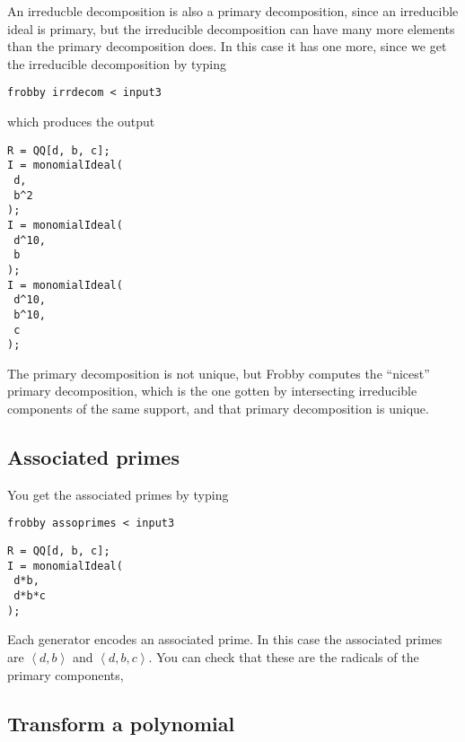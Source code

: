 \documentclass{amsart}
\theoremstyle{definition}
\newcommand{\ideal}[1]{\left<#1\right>}
\begin{document}
An irreducble decomposition is also a primary decomposition, since an
irreducible ideal is primary, but the irreducible decomposition can
have many more elements than the primary decomposition does. In this
case it has one more, since we get the irreducible decomposition by typing
\begin{verbatim}
frobby irrdecom < input3
\end{verbatim}
which produces the output
\begin{verbatim}
R = QQ[d, b, c];
I = monomialIdeal(
 d,
 b^2
);
I = monomialIdeal(
 d^10,
 b
);
I = monomialIdeal(
 d^10,
 b^10,
 c
);
\end{verbatim}

The primary decomposition is not unique, but Frobby computes the
``nicest'' primary decomposition, which is the one gotten by
intersecting irreducible components of the same support, and that
primary decomposition is unique.

\subsection{Associated primes}

You get the associated primes by typing
\begin{verbatim}
frobby assoprimes < input3
\end{verbatim}

\begin{verbatim}
R = QQ[d, b, c];
I = monomialIdeal(
 d*b,
 d*b*c
);
\end{verbatim}
Each generator encodes an associated prime. In this case the
associated primes are $\ideal{d,b}$ and $\ideal{d,b,c}$. You can check
that these are the radicals of the primary components,

\subsection{Transform a polynomial}
\end{document}
